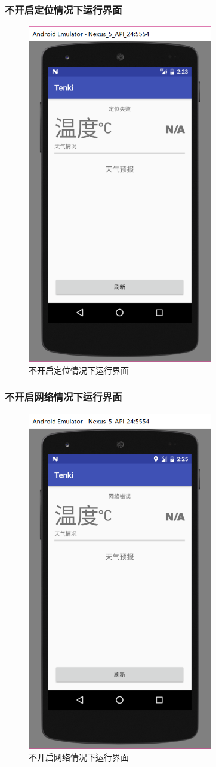 \documentclass[UTF8]{ctexart}
\begin{document}
      \subsubsection{不开启定位情况下运行界面}
        \begin{figure}[H]
          \caption{不开启定位情况下运行界面}
          \includegraphics[width=\textwidth, height=40em, keepaspectratio]{不开启定位情况下运行界面}
          \centering
        \end{figure}
      \subsubsection{不开启网络情况下运行界面}
        \begin{figure}[H]
          \caption{不开启网络情况下运行界面}
          \includegraphics[width=\textwidth, height=40em, keepaspectratio]{不开启网络情况下运行界面}
          \centering
        \end{figure}
\end{document}
